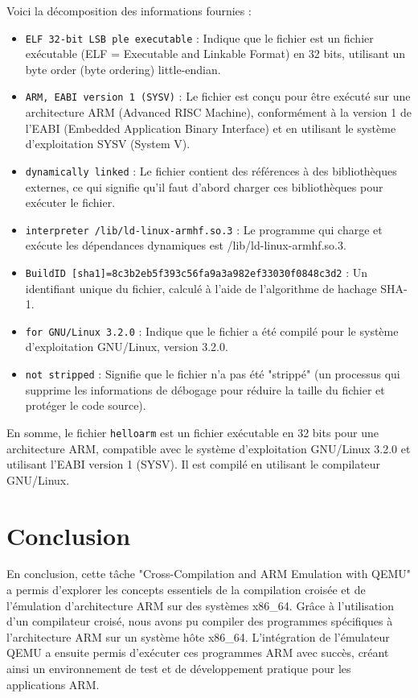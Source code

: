 Voici la décomposition des informations fournies :

\begin{itemize}
    \item \texttt{ELF 32-bit LSB ple executable} : Indique que le fichier est un fichier exécutable (ELF = Executable and Linkable Format) en 32 bits, utilisant un byte order (byte ordering) little-endian.
    \item \texttt{ARM, EABI version 1 (SYSV)} : Le fichier est conçu pour être exécuté sur une architecture ARM (Advanced RISC Machine), conformément à la version 1 de l'EABI (Embedded Application Binary Interface) et en utilisant le système d'exploitation SYSV (System V).
    \item \texttt{dynamically linked} : Le fichier contient des références à des bibliothèques externes, ce qui signifie qu'il faut d'abord charger ces bibliothèques pour exécuter le fichier.
    \item \texttt{interpreter /lib/ld-linux-armhf.so.3} : Le programme qui charge et exécute les dépendances dynamiques est /lib/ld-linux-armhf.so.3.
    \item \texttt{BuildID [sha1]=8c3b2eb5f393c56fa9a3a982ef33030f0848c3d2} : Un identifiant unique du fichier, calculé à l'aide de l'algorithme de hachage SHA-1.
    \item \texttt{for GNU/Linux 3.2.0} : Indique que le fichier a été compilé pour le système d'exploitation GNU/Linux, version 3.2.0.
    \item \texttt{not stripped} : Signifie que le fichier n'a pas été "strippé" (un processus qui supprime les informations de débogage pour réduire la taille du fichier et protéger le code source).
\end{itemize}

En somme, le fichier \texttt{helloarm} est un fichier exécutable en 32 bits pour une architecture ARM, compatible avec le système d'exploitation GNU/Linux 3.2.0 et utilisant l'EABI version 1 (SYSV). Il est compilé en utilisant le compilateur GNU/Linux.
\section*{Conclusion}
En conclusion, cette tâche "Cross-Compilation and ARM Emulation with QEMU" a permis d'explorer les concepts essentiels de la compilation croisée et de l'émulation d'architecture ARM sur des systèmes x86\_64. Grâce à l'utilisation d'un compilateur croisé, nous avons pu compiler des programmes spécifiques à l'architecture ARM sur un système hôte x86\_64. L'intégration de l'émulateur QEMU a ensuite permis d'exécuter ces programmes ARM avec succès, créant ainsi un environnement de test et de développement pratique pour les applications ARM.